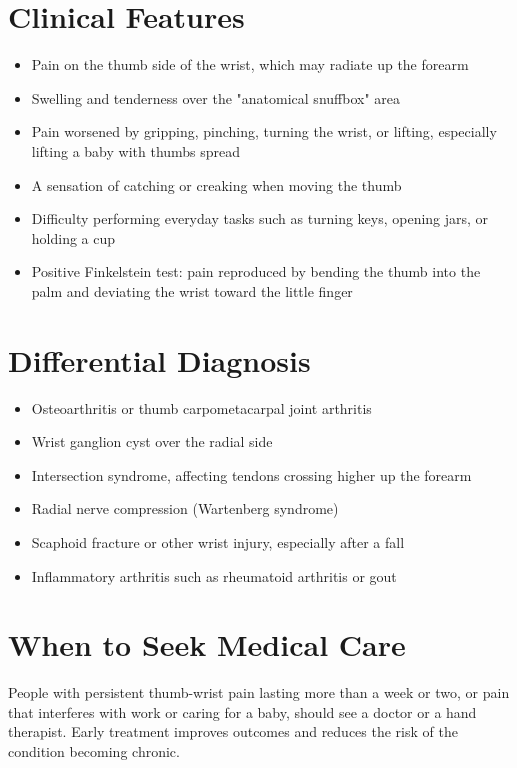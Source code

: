 \section*{Clinical Features}
\begin{itemize}
    \item Pain on the thumb side of the wrist, which may radiate up the forearm
    \item Swelling and tenderness over the "anatomical snuffbox" area
    \item Pain worsened by gripping, pinching, turning the wrist, or lifting, especially lifting a baby with thumbs spread
    \item A sensation of catching or creaking when moving the thumb
    \item Difficulty performing everyday tasks such as turning keys, opening jars, or holding a cup
    \item Positive Finkelstein test: pain reproduced by bending the thumb into the palm and deviating the wrist toward the little finger
\end{itemize}

\section*{Differential Diagnosis}
\begin{itemize}
    \item Osteoarthritis or thumb carpometacarpal joint arthritis
    \item Wrist ganglion cyst over the radial side
    \item Intersection syndrome, affecting tendons crossing higher up the forearm
    \item Radial nerve compression (Wartenberg syndrome)
    \item Scaphoid fracture or other wrist injury, especially after a fall
    \item Inflammatory arthritis such as rheumatoid arthritis or gout
\end{itemize}

\section*{When to Seek Medical Care}
People with persistent thumb-wrist pain lasting more than a week or two, or pain that interferes with work or caring for a baby, should see a doctor or a hand therapist. Early treatment improves outcomes and reduces the risk of the condition becoming chronic.

